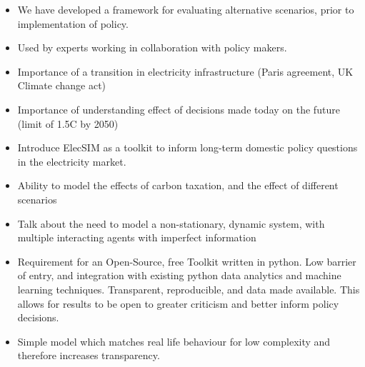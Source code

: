 \begin{itemize}
	\item We have developed a framework for evaluating alternative scenarios, prior to implementation of policy.
	\item Used by experts working in collaboration with policy makers.
	\item Importance of a transition in electricity infrastructure (Paris agreement, UK Climate change act)
	\item Importance of understanding effect of decisions made today on the future (limit of 1.5C by 2050)
	\item Introduce ElecSIM as a toolkit to inform long-term domestic policy questions in the electricity market. 
	\item Ability to model the effects of carbon taxation, and the effect of different scenarios 
	\item Talk about the need to model a non-stationary, dynamic system, with multiple interacting agents with imperfect information
	\item Requirement for an Open-Source, free Toolkit written in python. Low barrier of entry, and integration with existing python data analytics and machine learning techniques. Transparent, reproducible, and data made available. This allows for results to be open to greater criticism and better inform policy decisions.
	\item Simple model which matches real life behaviour for low complexity and therefore increases transparency.
\end{itemize}

